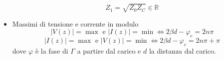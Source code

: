\documentclass{book}
\begin{document}
\begin{itemize}
            \begin{equation}
                Z_{1} = \sqrt{Z_{0}Z_{C}} \in \mathbb{R}
            \end{equation}
            \item Massimi di tensione e corrente in modulo
            \begin{equation}
                |V(z)| = \max \textrm{ e } |I(z)| = \min \iff  2\beta d- \varphi_{c} = 2n \pi 
            \end{equation}
            \begin{equation}
                |I(z)| = \max \textrm{ e } |V(z)| = \min \iff 2\beta d - \varphi_{c} = 2n \pi +\pi
            \end{equation}
            dove $\varphi$ è la fase di $\Gamma$ a partire dal carico e $d$ la distanza dal carico.
        \end{itemize}
\end{document}
